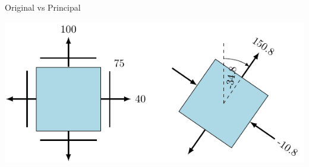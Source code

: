 \documentclass[10pt, svgnames]{beamer}
\begin{document}
\begin{frame}[label={sec:org801a719}]{Original vs Principal}
\begin{center}
\includegraphics[width=.9\linewidth]{pictures/orig-vs-principal.pdf}
\end{center}
\end{frame}
\end{document}
